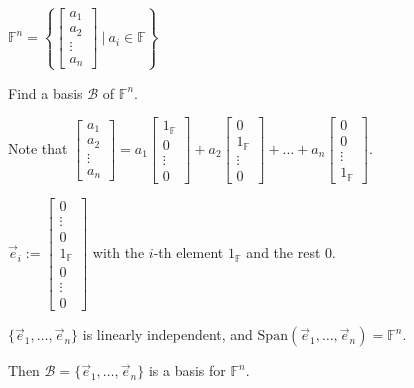 \documentclass[11pt,fleqn]{book} %
\begin{document}
\begin{example}
{~~~}

    $\mathbb{F}^n = \left\{ \begin{bmatrix} a_1\\a_2\\\vdots\\a_n \end{bmatrix} ~|~a_i \in \mathbb{F} \right\}$
    
    Find a basis $\mathcal{B}$ of $\mathbb{F}^n$. 
    
    Note that $\begin{bmatrix} a_1\\a_2\\\vdots\\a_n \end{bmatrix} = a_1\begin{bmatrix}1_{\mathbb{F}}\\0\\\vdots\\0 \end{bmatrix} + a_2\begin{bmatrix} 0\\1_{\mathbb{F}}\\\vdots\\0 \end{bmatrix} + \dots + a_n\begin{bmatrix} 0\\0\\\vdots\\1_{\mathbb{F}} \end{bmatrix}$. 
    
    $\vec{e}_i := \begin{bmatrix} 0\\\vdots\\0\\1_{\mathbb{F}}\\0\\\vdots\\0 \end{bmatrix}$ with the $i$-th element $1_\mathbb{F}$ and the rest $0$. 
    
    $\{\vec{e}_1, \dots, \vec{e}_n\}$ is linearly independent, and $\mathrm{Span}\left( \vec{e}_1, \dots, \vec{e}_n \right) = \mathbb{F}^n$. 
    
    Then $\mathcal{B} = \{\vec{e}_1, \dots, \vec{e}_n\} $ is a basis for $\mathbb{F}^n$. 
\end{example}
\end{document}
